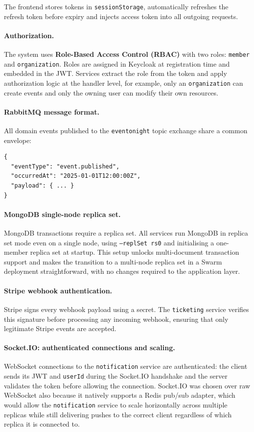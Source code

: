 The frontend stores tokens in \texttt{sessionStorage}, automatically refreshes the refresh token before expiry and injects access token into all outgoing requests.

\paragraph{Authorization.} The system uses \textbf{Role-Based Access Control (RBAC)} with two roles: \texttt{member} and \texttt{organization}. Roles are assigned in Keycloak at registration time and embedded in the JWT. Services extract the role from the token and apply authorization logic at the handler level, for example, only an \texttt{organization} can create events and only the owning user can modify their own resources.

\paragraph{RabbitMQ message format.} All domain events published to the \texttt{eventonight} topic exchange share a common envelope:

\begin{lstlisting}[]
{
  "eventType": "event.published",
  "occurredAt": "2025-01-01T12:00:00Z",
  "payload": { ... }
}
\end{lstlisting}
\label{lst:event-envelope}

\paragraph{MongoDB single-node replica set.} MongoDB transactions require a replica set. All services run MongoDB in replica set mode even on a single node, using \texttt{--replSet rs0} and initialising a one-member replica set at startup. This setup unlocks multi-document transaction support and makes the transition to a multi-node replica set in a Swarm deployment straightforward, with no changes required to the application layer.

\paragraph{Stripe webhook authentication.} Stripe signs every webhook payload using a secret. The \texttt{ticketing} service verifies this signature before processing any incoming webhook, ensuring that only legitimate Stripe events are accepted.

\paragraph{Socket.IO: authenticated connections and scaling.} WebSocket connections to the \texttt{notification} service are authenticated: the client sends its JWT and \texttt{userId} during the Socket.IO handshake and the server validates the token before allowing the connection. Socket.IO was chosen over raw WebSocket also because it natively supports a Redis pub/sub adapter, which would allow the \texttt{notification} service to scale horizontally across multiple replicas while still delivering pushes to the correct client regardless of which replica it is connected to.

